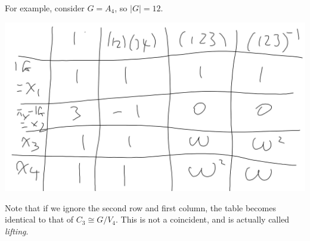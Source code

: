 \documentclass[a4paper]{article}
\begin{document}
For example, consider $G=A_4$, so $|G| = 12$.

\includegraphics[scale=0.6]{image/Rep_05.png}

Note that if we ignore the second row and first column, the table becomes identical to that of $C_3 \cong G/V_4$. This is not a coincident, and is actually called \emph{lifting}.

\newpage
\end{document}
